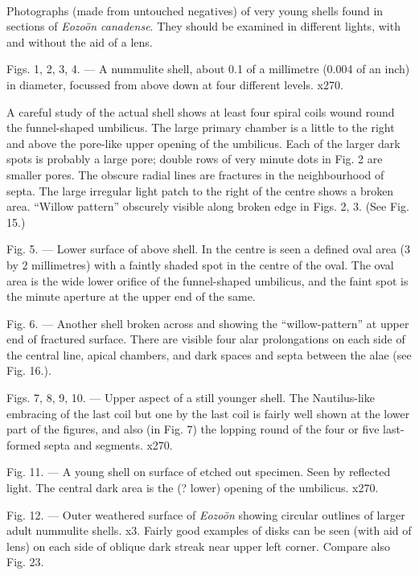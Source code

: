 \documentclass[a4paper, 12pt, oneside]{article}
\begin{document}
\paragraph{}
Photographs (made from untouched negatives) of very young shells found in sections of \emph{Eozoön canadense}. They should be examined in different lights, with and without the aid of a lens.

Figs. 1, 2, 3, 4. --- A nummulite shell, about 0.1 of a millimetre (0.004 of an inch) in diameter, focussed from above down at four different levels. x270.

A careful study of the actual shell shows at least four spiral coils wound round the funnel-shaped umbilicus. The large primary chamber is a little to the right and above the pore-like upper opening of the umbilicus. Each of the larger dark spots is probably a large pore; double rows of very minute dots in Fig. 2 are smaller pores. The obscure radial lines are fractures in the neighbourhood of septa. The large irregular light patch to the right of the centre shows a broken area. ``Willow pattern'' obscurely visible along broken edge in Figs. 2, 3. (See Fig. 15.)

Fig. 5. --- Lower surface of above shell. In the centre is seen a defined oval area (3 by 2 millimetres) with a faintly shaded spot in the centre of the oval. The oval area is the wide lower orifice of the funnel-shaped umbilicus, and the faint spot is the minute aperture at the upper end of the same.

Fig. 6. --- Another shell broken across and showing the ``willow-pattern'' at upper end of fractured surface. There are visible four alar prolongations on each side of the central line, apical chambers, and dark spaces and septa between the alae (see Fig. 16.).

Figs. 7, 8, 9, 10. --- Upper aspect of a still younger shell. The Nautilus-like embracing of the last coil but one by the last coil is fairly well shown at the lower part of the figures, and also (in Fig. 7) the lopping round of the four or five last-formed septa and segments. x270.

Fig. 11. --- A young shell on surface of etched out specimen. Seen by reflected light. The central dark area is the (? lower) opening of the umbilicus. x270.

Fig. 12. --- Outer weathered surface of \emph{Eozoön} showing circular outlines of larger adult nummulite shells. x3. Fairly good examples of disks can be seen (with aid of lens) on each side of oblique dark streak near upper left corner. Compare also Fig. 23.
\end{document}
